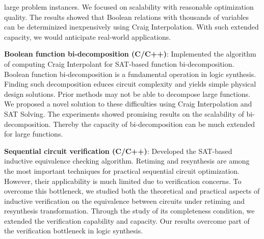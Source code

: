 \begin{myexp}
\begin{myexp}
        large problem instances. We focused on scalability with reasonable
        optimization quality. The results showed that Boolean relations with
        thousands of variables can be determinized inexpensively using Craig
        Interpolation. With such extended capacity, we would anticipate
        real-world applications. 
    \item {\bf Boolean function bi-decomposition (C/C++)}: 
        Implemented the algorithm of computing Craig Interpolant for SAT-based
        function bi-decomposition. Boolean function bi-decomposition is a
        fundamental operation in logic synthesis. Finding such decomposition
        educes circuit complexity and yields simple physical design solutions.
        Prior methods may not be able to decompose large functions. We proposed
        a novel solution to these difficulties using Craig Interpolation and
        SAT Solving. The experiments showed promising results on the
        scalability of bi-decomposition. Thereby the capacity of
        bi-decomposition can be much extended for large functions.
    \item {\bf Sequential circuit verification (C/C++)}: 
        Developed the SAT-based inductive equivalence checking
        algorithm. Retiming and resynthesis are among the most important 
        techniques for practical sequential circuit optimization. However, their
        applicability is much limited due to verification concerns. To overcome
        this bottleneck, we studied both the theoretical and practical aspects
        of inductive verification on the equivalence between circuits under 
        retiming and resynthesis transformation. Through the study of its
        completeness condition, we extended the verification capability and 
        capacity. Our results overcome part of the verification bottleneck in
        logic synthesis.
\end{myexp}
\end{myexp}
